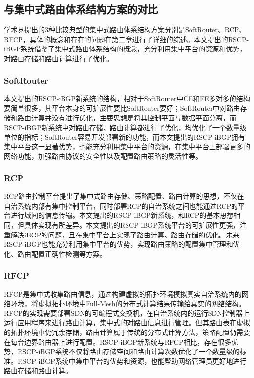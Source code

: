 \subsection{与集中式路由体系结构方案的对比}


学术界提出的3种比较典型的集中式路由体系结构方案分别是SoftRouter、RCP、RFCP，具体的概念和存在的问题在第二章进行了详细的综述。本文提出的RSCP-iBGP系统借鉴了集中式路由体系结构的概念，充分利用集中平台的资源和优势，对路由存储和路由计算进行了优化。

\subsubsection{SoftRouter}

本文提出的RSCP-iBGP新系统的结构，相对于SoftRouter中CE和FE多对多的结构要简单很多，其平台本身的可扩展性要比SoftRouter要好；SoftRouter中对路由存储和路由计算并没有进行优化，主要思想是将其控制平面与数据平面分离，而RSCP-iBGP新系统中对路由存储、路由计算都进行了优化，均优化了一个数量级单位的指标；SoftRouter容易开发部署新的功能，而本文提出的RSCP-iBGP拥有集中平台这一显著优势，也能充分利用集中平台的资源，在集中平台上部署更多的网络功能，加强路由协议的安全性以及配置路由策略的灵活性等。

\subsubsection{RCP}
RCP路由控制平台提出了集中式路由存储、策略配置、路由计算的思想，不仅在自治系统内部有集中控制平台，同时部署RCP的自治系统之间也能通过RCP的平台进行域间的信息传输。本文提出的RSCP-iBGP新系统，和RCP的基本思想相同，但具体实现有所差异。本文提出的RSCP-iBGP系统平台的可扩展性更强，注重解决iBGP的问题，且在集中平台上实现了路由计算、路由存储的优化。未来RSCP-iBGP也能充分利用集中平台的优势，实现路由策略的配置集中管理和优化、路由配置正确性检测等方案。


\subsubsection{RFCP}

RFCP是集中式收集路由信息，通过构建虚拟的拓扑环境模拟真实自治系统内的网络环境，将虚拟拓扑环境中Full-Mesh的分布式计算结果传输给真实的网络结构。RFCP的实现需要部署SDN的可编程式交换机，在自治系统内的运行SDN控制器上运行应用程序来进行路由计算，集中式的对路由信息进行管理。但其路由表在虚拟的拓扑环境中仍冗余存储，路由计算属于传统的分布式计算方法，策略配置仍需要在每台边界路由器上进行配置。RSCP-iBGP新系统与RFCP相比，存在很多优势，RSCP-iBGP系统不仅将路由存储空间和路由计算次数优化了一个数量级的标准。RSCP-iBGP系统中集中平台的优势和资源，也能帮助网络管理员更好地进行路由存储和路由计算。


